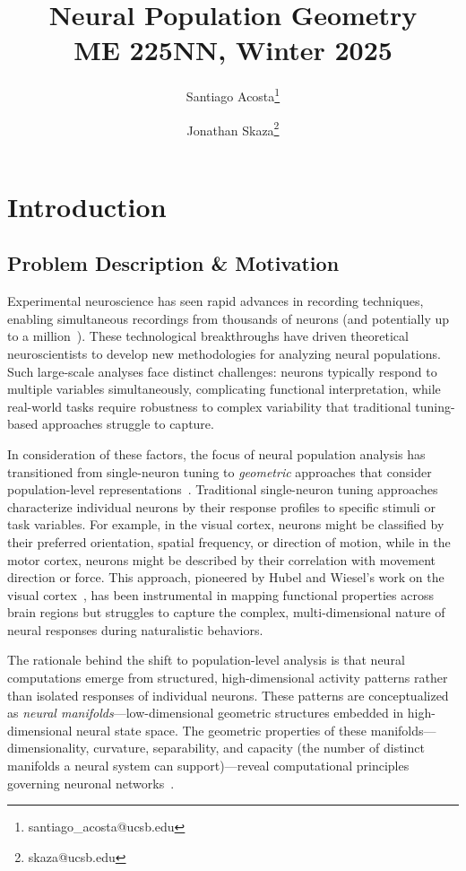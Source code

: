 \documentclass[11pt,a4paper]{article}
\author[1]{Santiago Acosta\thanks{santiago\_acosta@ucsb.edu}}
\author[1]{Jonathan Skaza\thanks{skaza@ucsb.edu}}
\affil[1]{Dynamical Neuroscience Graduate Program, University of California, Santa Barbara}
\title {Neural Population Geometry \\[1ex] \large ME 225NN, Winter 2025}
\date{}
\begin{document}
\maketitle
\section{Introduction}

\subsection{Problem Description \& Motivation}
Experimental neuroscience has seen rapid advances in recording techniques, enabling simultaneous recordings from thousands of neurons (and potentially up to a million~\cite{demas2021high}). These technological breakthroughs have driven theoretical neuroscientists to develop new methodologies for analyzing neural populations. Such large-scale analyses face distinct challenges: neurons typically respond to multiple variables simultaneously, complicating functional interpretation, while real-world tasks require robustness to complex variability that traditional tuning-based approaches struggle to capture.

In consideration of these factors, the focus of neural population analysis has transitioned from single-neuron tuning to \textit{geometric} approaches that consider population-level representations~\cite{yuste2015neuron, saxena2019towards}. Traditional single-neuron tuning approaches characterize individual neurons by their response profiles to specific stimuli or task variables. For example, in the visual cortex, neurons might be classified by their preferred orientation, spatial frequency, or direction of motion, while in the motor cortex, neurons might be described by their correlation with movement direction or force. This approach, pioneered by Hubel and Wiesel's work on the visual cortex~\cite{hubel1959receptive}, has been instrumental in mapping functional properties across brain regions but struggles to capture the complex, multi-dimensional nature of neural responses during naturalistic behaviors.

The rationale behind the shift to population-level analysis is that neural computations emerge from structured, high-dimensional activity patterns rather than isolated responses of individual neurons. These patterns are conceptualized as \textit{neural manifolds}---low-dimensional geometric structures embedded in high-dimensional neural state space. The geometric properties of these manifolds---dimensionality, curvature, separability, and capacity (the number of distinct manifolds a neural system can support)---reveal computational principles governing neuronal networks~\cite{chung2021neural}. 
\end{document}
